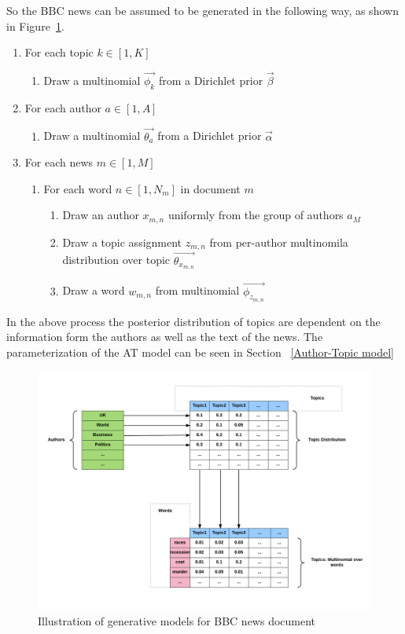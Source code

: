 So the BBC news can be assumed to be generated in the following way, as shown in Figure~\ref{fig:author_diagram}.

\begin{enumerate}
   \item For each topic $k \in [1,K]$
   \begin{enumerate}
     \item Draw a multinomial $\vec{\phi_k}$ from a Dirichlet prior $\vec{\beta}$
    \end{enumerate}
   \item For each author $a \in [1,A]$
   \begin{enumerate}
     \item Draw a multinomial $\vec{\theta_a}$ from a Dirichlet prior $\vec{\alpha}$
    \end{enumerate}
    \item For each news $m \in [1,M]$
   \begin{enumerate}
     \item For each word $n \in [1,N_m]$ in document $m$
     \begin{enumerate}
            \item Draw an author $x_{m,n}$ uniformly from the group of authors $a_M$
            \item Draw a topic assignment $z_{m,n}$ from per-author multinomila distribution over topic $\vec{\theta_{x_{m,n}}}$
            \item Draw a word $w_{m,n}$ from multinomial $\vec{\phi_{z_{m,n}}}$
    \end{enumerate}
    \end{enumerate}
        
\end{enumerate}

In the above process the posterior distribution of topics are dependent on the information form the authors as well as the text of the news. The parameterization of the AT model can be seen in Section ~\ref{Author-Topic model}

\begin{figure}[h]
\centering
\includegraphics[width=\textwidth]{figures/author_diagram.png}
\caption{Illustration of generative models for BBC news document}
\label{fig:author_diagram}
\end{figure}


